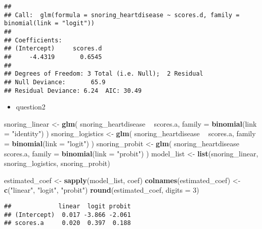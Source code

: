 \documentclass[12pt,hyperref,]{ctexart}
\newenvironment{Shaded}{\begin{snugshade}}{\end{snugshade}}
\newcommand{\DataTypeTok}[1]{\textcolor[rgb]{0.13,0.29,0.53}{#1}}
\newcommand{\DecValTok}[1]{\textcolor[rgb]{0.00,0.00,0.81}{#1}}
\newcommand{\KeywordTok}[1]{\textcolor[rgb]{0.13,0.29,0.53}{\textbf{#1}}}
\newcommand{\NormalTok}[1]{#1}
\newcommand{\OperatorTok}[1]{\textcolor[rgb]{0.81,0.36,0.00}{\textbf{#1}}}
\newcommand{\StringTok}[1]{\textcolor[rgb]{0.31,0.60,0.02}{#1}}
\providecommand{\tightlist}{%
  \setlength{\itemsep}{0pt}\setlength{\parskip}{0pt}}
\begin{document}
\begin{verbatim}
## 
## Call:  glm(formula = snoring_heartdisease ~ scores.d, family = binomial(link = "logit"))
## 
## Coefficients:
## (Intercept)     scores.d  
##     -4.4319       0.6545  
## 
## Degrees of Freedom: 3 Total (i.e. Null);  2 Residual
## Null Deviance:       65.9 
## Residual Deviance: 6.24  AIC: 30.49
\end{verbatim}

\begin{itemize}
\tightlist
\item
  question2
\end{itemize}

\begin{Shaded}
\begin{Highlighting}[]
\NormalTok{snoring_linear <-}\StringTok{ }\KeywordTok{glm}\NormalTok{(}
\NormalTok{snoring_heartdisease }\OperatorTok{~}\StringTok{ }\NormalTok{scores.a, }\DataTypeTok{family =} \KeywordTok{binomial}\NormalTok{(}\DataTypeTok{link =} \StringTok{"identity"}\NormalTok{)}
\NormalTok{)}
\NormalTok{snoring_logistics <-}\StringTok{ }\KeywordTok{glm}\NormalTok{(}
\NormalTok{snoring_heartdisease }\OperatorTok{~}\StringTok{ }\NormalTok{scores.a, }\DataTypeTok{family =} \KeywordTok{binomial}\NormalTok{(}\DataTypeTok{link =} \StringTok{"logit"}\NormalTok{)}
\NormalTok{)}
\NormalTok{snoring_probit <-}\StringTok{ }\KeywordTok{glm}\NormalTok{(}
\NormalTok{snoring_heartdisease }\OperatorTok{~}\StringTok{ }\NormalTok{scores.a, }\DataTypeTok{family =} \KeywordTok{binomial}\NormalTok{(}\DataTypeTok{link =} \StringTok{"probit"}\NormalTok{)}
\NormalTok{)}
\NormalTok{model_list <-}\StringTok{ }\KeywordTok{list}\NormalTok{(snoring_linear, snoring_logistics, snoring_probit)}

\NormalTok{estimated_coef <-}\StringTok{ }\KeywordTok{sapply}\NormalTok{(model_list, coef)}
\KeywordTok{colnames}\NormalTok{(estimated_coef) <-}\StringTok{ }\KeywordTok{c}\NormalTok{(}\StringTok{"linear"}\NormalTok{, }\StringTok{"logit"}\NormalTok{, }\StringTok{"probit"}\NormalTok{)}
\KeywordTok{round}\NormalTok{(estimated_coef, }\DataTypeTok{digits =} \DecValTok{3}\NormalTok{)}
\end{Highlighting}
\end{Shaded}

\begin{verbatim}
##             linear  logit probit
## (Intercept)  0.017 -3.866 -2.061
## scores.a     0.020  0.397  0.188
\end{verbatim}
\end{document}
